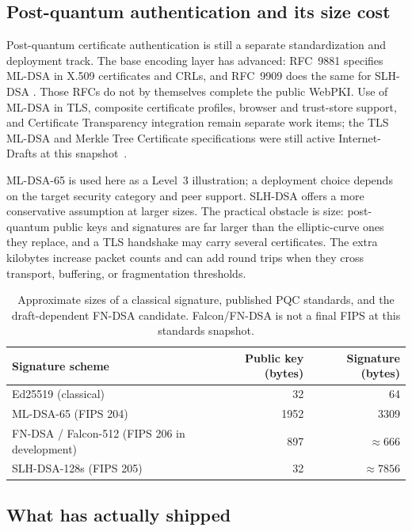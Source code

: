 \subsection{Post-quantum authentication and its size cost}
Post-quantum certificate authentication is still a separate standardization and
deployment track. The base encoding layer has advanced: RFC~9881 specifies ML-DSA
in X.509 certificates and CRLs, and RFC~9909 does the same for SLH-DSA
\cite{rfc9881,rfc9909}. Those RFCs do not by themselves complete the public WebPKI.
Use of ML-DSA in TLS, composite certificate profiles, browser and trust-store
support, and Certificate Transparency integration remain separate work items;
the TLS ML-DSA and Merkle Tree Certificate specifications were still active
Internet-Drafts at this snapshot~\cite{tlsmldsa2026,plantsmtc2026}.

ML-DSA-65 is used here as a Level~3 illustration; a deployment choice depends on
the target security category and peer support. SLH-DSA offers a more conservative
assumption at larger sizes. The practical
obstacle is size: post-quantum public keys and signatures are far larger than the
elliptic-curve ones they replace, and a TLS handshake may carry several certificates.
The extra kilobytes increase packet counts and can add round trips when they cross
transport, buffering, or fragmentation thresholds.

\begin{table}[H]
\centering
\begin{tabular}{lrr}
\toprule
Signature scheme & Public key (bytes) & Signature (bytes) \\
\midrule
Ed25519 (classical)   & 32   & 64 \\
ML-DSA-65 (FIPS 204)  & 1952 & 3309 \\
FN-DSA / Falcon-512 (FIPS 206 in development) & 897 & $\approx 666$ \\
SLH-DSA-128s (FIPS 205) & 32 & $\approx 7856$ \\
\bottomrule
\end{tabular}
\caption{Approximate sizes of a classical signature, published PQC standards, and the draft-dependent FN-DSA candidate. Falcon/FN-DSA is not a final FIPS at this standards snapshot.}
\label{tab:sig-sizes}
\end{table}

\subsection{What has actually shipped}
\label{sec:pq-adoption}

